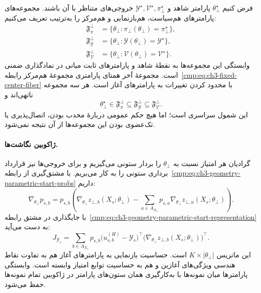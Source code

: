 فرض کنیم $\theta_\bot^\star$ پارامتر شاهد و $\mathscr Y^\star,\mathcal V^\star,\pi_\bot^\star$ خروجی‌های متناظر با آن باشند. مجموعه‌های پارامترهای هم‌سیاست، هم‌بازنمایی و هم‌مرکز را به‌ترتیب تعریف می‌کنیم:
\begin{equation}\label{cmp:eq:ch3-geometry-parametric-fiber-sets}
\begin{aligned}
\mathfrak F_\pi^\bot&=\{\theta_\bot:\pi_\bot(\theta_\bot)=\pi_\bot^\star\},\\
\mathfrak F_{\mathscr Y}^\bot&=\{\theta_\bot:\mathscr Y(\theta_\bot)=\mathscr Y^\star\},\\
\mathfrak F_{\mathcal V}^\bot&=\{\theta_\bot:\mathcal V(\theta_\bot)=\mathcal V^\star\}.
\end{aligned}
\end{equation}
وابستگی این مجموعه‌ها به نقطهٔ شاهد و پارامترهای ثابت میانی در نمادگذاری ضمنی است. مجموعهٔ آخر همتای پارامتری مجموعهٔ هم‌مرکز رابطه~\eqref{cmp:eq:ch3-fixed-center-fiber} با محدود کردن تغییرات به پارامترهای آغاز است. هر سه مجموعه ناتهی‌اند و
\begin{equation}\label{cmp:eq:ch3-geometry-parametric-fiber-inclusion}
\theta_\bot^\star\in\mathfrak F_\pi^\bot
\subseteq\mathfrak F_{\mathscr Y}^\bot\subseteq\mathfrak F_{\mathcal V}^\bot.
\end{equation}
این شمول سراسری است؛ اما هیچ حکم عمومی دربارهٔ محدب بودن، اتصال‌پذیری یا تک‌عضوی بودن این مجموعه‌ها از آن نتیجه نمی‌شود.

\paragraph{ژاکوبین نگاشت‌ها.}
گرادیان هر امتیاز نسبت به $\theta_\bot$ را بردار ستونی می‌گیریم و برای خروجی‌ها نیز قرارداد برداری ستونی را به کار می‌بریم. با مشتق‌گیری از رابطه~\eqref{cmp:eq:ch3-geometry-parametric-start-probs} داریم:
\begin{equation}\label{cmp:eq:ch3-geometry-parametric-start-prob-gradient}
\nabla_{\theta_\bot}p_{s,b}=p_{s,b}\left(\nabla_{\theta_\bot}z_{\bot,b}(X_s;\theta_\bot)-\sum_{a\in A_{X_s}}p_{s,a}\nabla_{\theta_\bot}z_{\bot,a}(X_s;\theta_\bot)\right).
\end{equation}
با جایگذاری در مشتق رابطه~\eqref{cmp:eq:ch3-geometry-parametric-start-representation} به دست می‌آید:
\begin{equation}\label{cmp:eq:ch3-geometry-parametric-start-Jsample}
\boxed{J_{\mathscr Y_s}=\sum_{b\in A_{X_s}}p_{s,b}
\bigl(u_{s,b}^{(H)}-\mathscr Y_s\bigr)^\top
\bigl(\nabla_{\theta_\bot}z_{\bot,b}(X_s;\theta_\bot)\bigr)^\top.}
\end{equation}
این ماتریس $K\times|\theta_\bot|$ است. حساسیت بازنمایی به پارامترهای آغاز هم به تفاوت نقاط هندسی ویژگی‌های آغازین و هم به حساسیت توابع امتیاز وابسته است. وابستگی پارامترها میان نمونه‌ها با به‌کارگیری همان ستون‌های پارامتر در ژاکوبین تمام نمونه‌ها حفظ می‌شود.

